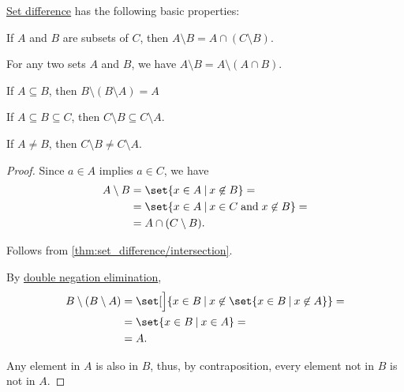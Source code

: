 \begin{proposition}\label{thm:set_difference}
  \hyperref[def:basic_set_operations/difference]{Set difference} has the following basic properties:
  \begin{thmenum}
     If \( A \) and \( B \) are subsets of \( C \), then \( A \setminus B = A \cap (C \setminus B) \).

     For any two sets \( A \) and \( B \), we have \( A \setminus B = A \setminus (A \cap B) \).

     If \( A \subseteq B \), then \( B \setminus (B \setminus A) = A \)

     If \( A \subseteq B \subseteq C \), then \( C \setminus B \subseteq C \setminus A \).

    If \( A \neq B \), then \( C \setminus B \neq C \setminus A \).
  \end{thmenum}
\end{proposition}
\begin{proof}
   Since \( a \in A \) implies \( a \in C \), we have
  \begin{align*}
    A \setminus B
    &=
    \set{ x \in A \given x \not\in B }
    = \\ &=
    \set{ x \in A \given x \in C \T{and} x \not\in B }
    = \\ &=
    A \cap (C \setminus B).
  \end{align*}

   Follows from \cref{thm:set_difference/intersection}.

   By \hyperref[thm:classical_tautologies/dne]{double negation elimination},
  \begin{align*}
    B \setminus (B \setminus A)
    &=
    \set[\Big]{ x \in B \given x \not\in \set{ x \in B \given x \not\in A } }
    = \\ &=
    \set{ x \in B \given x \in A }
    = \\ &=
    A.
  \end{align*}

   Any element in \( A \) is also in \( B \), thus, by contraposition, every element not in \( B \) is not in \( A \).
\end{proof}

